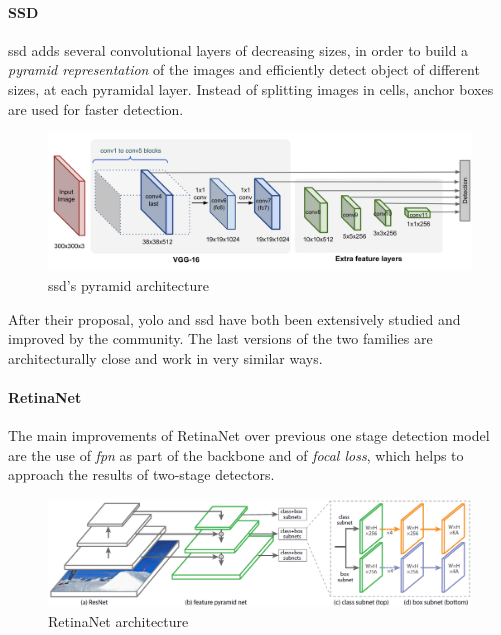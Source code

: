 \documentclass[%
    corpo=12pt,
    twoside,
    stile=classica,   
    tipotesi=magistrale,
    evenboxes,
    english,
	numerazioneromana,
]{toptesi}
\begin{document}
\paragraph{SSD}
\gls{ssd}\cite{Liu_2016} adds several convolutional layers of decreasing sizes, in order to build a \textit{pyramid representation} of the images and efficiently detect object of different sizes, at each pyramidal layer. Instead of splitting images in cells, anchor boxes are used for faster detection.

\begin{figure}
	\centering
	\includegraphics[width=.9\linewidth]{imgs/SSD-architecture.png}
	\caption{\acrshort{ssd}'s pyramid architecture\cite{objdetpart4}}
	\label{fig:ssd}
\end{figure}

After their proposal, \gls{yolo} and \gls{ssd} have both been extensively studied and improved by the community. The last versions of the two families are architecturally close and work in very similar ways.

\paragraph{RetinaNet}
The main improvements of RetinaNet\cite{lin2018focal} over previous one stage detection model are the use of \textit{\acrfull{fpn}} as part of the backbone and of \textit{focal loss}, which helps to approach the results of two-stage detectors.

\begin{figure}[b]
	\centering
	\includegraphics[width=\linewidth]{imgs/retinanet.png}
	\caption{RetinaNet architecture\cite{lin2018focal}}
	\label{fig:retinanet}
\end{figure}
\end{document}
